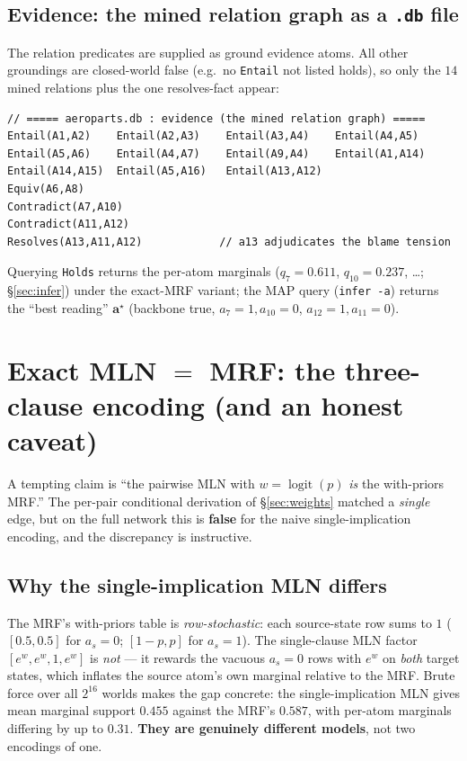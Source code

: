 \documentclass[11pt]{article}
\begin{document}
\subsection{Evidence: the mined relation graph as a \texttt{.db} file}
The relation predicates are supplied as ground evidence atoms. All other groundings are
closed-world false (e.g.\ no \lstinline[style=mln]!Entail! not listed holds), so only the $14$
mined relations plus the one resolves-fact appear:

\begin{lstlisting}[style=mln]
// ===== aeroparts.db : evidence (the mined relation graph) =====
Entail(A1,A2)    Entail(A2,A3)    Entail(A3,A4)    Entail(A4,A5)
Entail(A5,A6)    Entail(A4,A7)    Entail(A9,A4)    Entail(A1,A14)
Entail(A14,A15)  Entail(A5,A16)   Entail(A13,A12)
Equiv(A6,A8)
Contradict(A7,A10)
Contradict(A11,A12)
Resolves(A13,A11,A12)            // a13 adjudicates the blame tension
\end{lstlisting}

\noindent Querying \lstinline[style=mln]!Holds! returns the per-atom marginals
($q_7{=}0.611$, $q_{10}{=}0.237$, \dots; \S\ref{sec:infer}) under the exact-MRF variant; the
MAP query (\texttt{infer -a}) returns the ``best reading'' $\mathbf a^\star$
(backbone true, $a_7{=}1,a_{10}{=}0$, $a_{12}{=}1,a_{11}{=}0$).

\section{Exact MLN $=$ MRF: the three-clause encoding (and an honest caveat)}
\label{sec:equiv}

A tempting claim is ``the pairwise MLN with $w=\operatorname{logit}(p)$ \emph{is} the
with-priors MRF.'' The per-pair conditional derivation of \S\ref{sec:weights} matched a
\emph{single} edge, but on the full network this is \textbf{false} for the naive
single-implication encoding, and the discrepancy is instructive.

\subsection{Why the single-implication MLN differs}
The MRF's with-priors table is \emph{row-stochastic}: each source-state row sums to $1$
($[0.5,0.5]$ for $a_s{=}0$; $[1{-}p,p]$ for $a_s{=}1$). The single-clause MLN factor
$[e^{w},e^{w},1,e^{w}]$ is \emph{not} --- it rewards the vacuous $a_s{=}0$ rows with $e^w$ on
\emph{both} target states, which inflates the source atom's own marginal relative to the MRF.
Brute force over all $2^{16}$ worlds makes the gap concrete: the single-implication MLN gives
mean marginal support $0.455$ against the MRF's $0.587$, with per-atom marginals differing by
up to $0.31$. \textbf{They are genuinely different models}, not two encodings of one.
\end{document}

